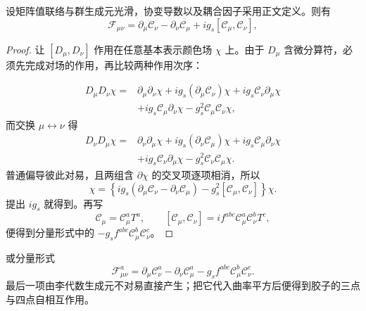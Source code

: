 \begin{proposition}[联络曲率的对易子表达]
设矩阵值联络与群生成元光滑，协变导数以及耦合因子采用正文定义。则有
\begin{equation}
{
\mathcal F_{\mu\nu}
=\partial_\mu\mathscr C_\nu-\partial_\nu\mathscr C_\mu
+i g_s[\mathscr C_\mu,\mathscr C_\nu],}
\label{eq:qcd-field-strength-matrix-dp10}
\end{equation}
\end{proposition}
\begin{proof}
让 $[D_\mu,D_\nu]$ 作用在任意基本表示颜色场 $\chi$ 上。由于 $D_\mu$ 含微分算符，必须先完成对场的作用，再比较两种作用次序：

\begin{align*}
D_\mu D_\nu\chi
={}&\partial_\mu\partial_\nu\chi
+i g_s(\partial_\mu\mathscr C_\nu)\chi
+i g_s\mathscr C_\nu\partial_\mu\chi\\
&+i g_s\mathscr C_\mu\partial_\nu\chi
-g_s^2\mathscr C_\mu\mathscr C_\nu\chi,
\end{align*}
而交换 $\mu\leftrightarrow\nu$ 得
\begin{align*}
D_\nu D_\mu\chi
={}&\partial_\nu\partial_\mu\chi
+i g_s(\partial_\nu\mathscr C_\mu)\chi
+i g_s\mathscr C_\mu\partial_\nu\chi\\
&+i g_s\mathscr C_\nu\partial_\mu\chi
-g_s^2\mathscr C_\nu\mathscr C_\mu\chi.
\end{align*}
普通偏导彼此对易，且两组含 $\partial\chi$ 的交叉项逐项相消，所以
\begin{equation*}
[D_\mu,D_\nu]\chi
=\left\{i g_s(\partial_\mu\mathscr C_\nu-\partial_\nu\mathscr C_\mu)
-g_s^2[\mathscr C_\mu,\mathscr C_\nu]\right\}\chi.
\end{equation*}
提出 $i g_s$ 就得到。再写
\begin{equation*}
\mathscr C_\mu=\mathscr C_\mu^aT^a,
\qquad
[\mathscr C_\mu,\mathscr C_\nu]
=i f^{abc}\mathscr C_\mu^a\mathscr C_\nu^bT^c,
\end{equation*}
便得到分量形式中的 $-g_sf^{abc}\mathscr C_\mu^b\mathscr C_\nu^c$。
\end{proof}

或分量形式
\begin{equation*}
\mathcal F_{\mu\nu}^a
=\partial_\mu\mathscr C_\nu^a-\partial_\nu\mathscr C_\mu^a
-g_sf^{abc}\mathscr C_\mu^b\mathscr C_\nu^c.
\end{equation*}
最后一项由李代数生成元不对易直接产生；把它代入曲率平方后便得到胶子的三点与四点自相互作用。

